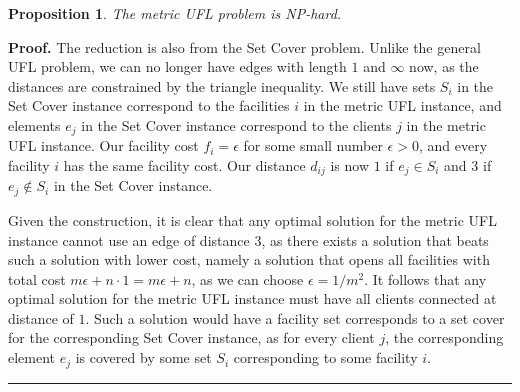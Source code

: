 \documentclass[oneside,final]{ucr}
\newtheorem{proposition}[theorem]{Proposition}
\newenvironment{proof}[1][Proof]{\textbf{#1.} }{\ \rule{0.5em}{0.5em}}
\begin{document}
\begin{proposition}
  The metric UFL problem is NP-hard.
\end{proposition}
\begin{proof}
  The reduction is also from the Set Cover problem. Unlike the general
  UFL problem, we can no longer have edges with length $1$ and
  $\infty$ now, as the distances are constrained by the triangle
  inequality. We still have sets $S_i$ in the Set Cover instance
  correspond to the facilities $i$ in the metric UFL instance, and
  elements $e_j$ in the Set Cover instance correspond to the clients
  $j$ in the metric UFL instance. Our facility cost $f_i = \epsilon$
  for some small number $\epsilon > 0$, and every facility $i$ has the
  same facility cost. Our distance $d_{ij}$ is now $1$ if $e_j \in
  S_i$ and $3$ if $e_j \notin S_i$ in the Set Cover instance.

  Given the construction, it is clear that any optimal solution for
  the metric UFL instance cannot use an edge of distance $3$, as there
  exists a solution that beats such a solution with lower cost, namely
  a solution that opens all facilities with total cost $m\epsilon +
  n\cdot 1 = m\epsilon + n$, as we can choose $\epsilon = 1/m^2$. It
  follows that any optimal solution for the metric UFL instance must
  have all clients connected at distance of $1$. Such a solution would
  have a facility set corresponds to a set cover for the corresponding
  Set Cover instance, as for every client $j$, the corresponding
  element $e_j$ is covered by some set $S_i$ corresponding to some
  facility $i$.
\end{proof}
\end{document}
